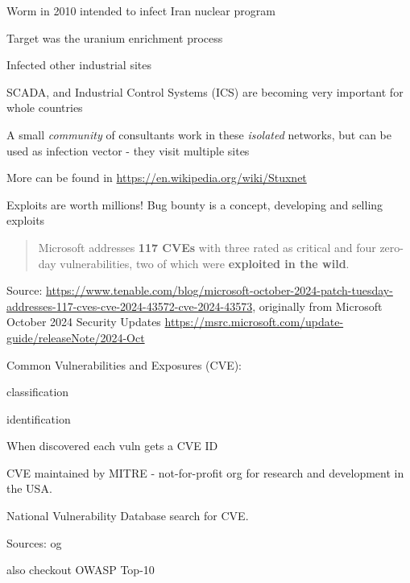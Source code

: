 \documentclass[Screen16to9,17pt]{foils}
\begin{document}

\begin{list1}
\item Worm in 2010 intended to infect Iran nuclear program
\item Target was the uranium enrichment process
\item Infected other industrial sites
\item SCADA, and Industrial Control Systems (ICS) are becoming very important for whole countries
\item A small \emph{community} of consultants work in these \emph{isolated} networks, but can be used as infection vector - they visit multiple sites
\item More can be found in \url{https://en.wikipedia.org/wiki/Stuxnet}
\end{list1}

\centerline{Exploits are worth millions! Bug bounty is a concept, developing and selling exploits}




\begin{quote}
Microsoft addresses {\bf 117 CVEs} with three rated as critical and four zero-day vulnerabilities, two of which were {\bf exploited in the wild}.
\end{quote}
Source: \url{https://www.tenable.com/blog/microsoft-october-2024-patch-tuesday-addresses-117-cves-cve-2024-43572-cve-2024-43573}, originally from Microsoft October 2024 Security Updates \url{https://msrc.microsoft.com/update-guide/releaseNote/2024-Oct}


\begin{list1}
\item Common Vulnerabilities and Exposures (CVE):
  \begin{list2}
  \item classification
  \item identification
  \end{list2}
\item When discovered each vuln gets a CVE ID
\item CVE maintained by MITRE - not-for-profit
org for research and development in the USA.
\item National Vulnerability Database search for CVE.
\item Sources:  og 
\item also checkout OWASP Top-10 
\end{list1}
\end{document}
